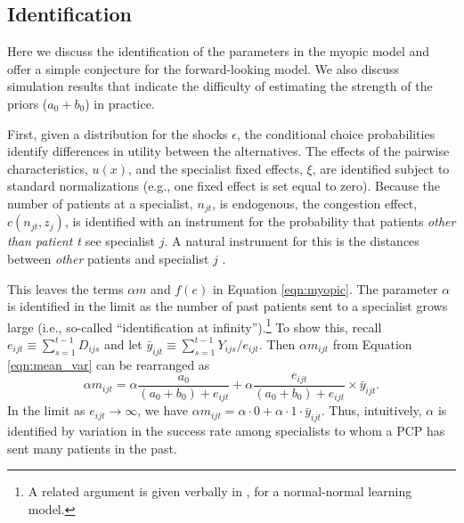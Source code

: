 \documentclass[12pt]{article}
\begin{document}

\subsection{Identification} 
\label{sec:identification}

Here we discuss the identification of the parameters in the myopic model and offer a simple conjecture for the forward-looking model. We also discuss simulation results that indicate the difficulty of estimating the strength of the priors ($a_0 + b_0$) in practice.

First, given a distribution for the shocks $\epsilon$, the conditional choice probabilities identify differences in utility between the alternatives. The effects of the pairwise characteristics, $u(x)$, and the specialist fixed effects, $\xi$, are identified subject to standard normalizations (e.g., one fixed effect is set equal to zero). Because the number of patients at a specialist, $n_{jt}$, is endogenous, the congestion effect, $c(n_{jt}, z_j)$, is identified with an instrument for the probability that patients \emph{other than patient t} see specialist $j$. A natural instrument for this is the distances between \emph{other} patients and specialist $j$ \citep[see the description of the estimation procedure in Section \ref{sec:estimation}, and][for further details]{richards-shubik2021}.

This leaves the terms $\alpha m$ and $f(e)$ in Equation \eqref{eqn:myopic}. The parameter $\alpha$ is identified in the limit as the number of past patients sent to a specialist grows large (i.e., so-called ``identification at infinity'').\footnote{A related argument is given verbally in \cite{ching2013}, for a normal-normal learning model.} To show this, recall $e_{ijt} \equiv \sum_{s=1}^{t-1} D_{ijs}$ and let $\bar y_{ijt} \equiv \sum_{s=1}^{t-1} Y_{ijs} / e_{ijt}$. Then $\alpha m_{ijt}$ from Equation \eqref{eqn:mean_var} can be rearranged as
\begin{equation}
\alpha m_{ijt} = \alpha \frac{ a_0 }{ (a_0 + b_0) + e_{ijt} }
+ \alpha \frac{ e_{ijt} }{ (a_0 + b_0) + e_{ijt} } \times \bar y_{ijt}.
\label{eqn:ID_eta}
\end{equation}
In the limit as $e_{ijt} \rightarrow \infty$, we have $\alpha m_{ijt} = \alpha \cdot 0 + \alpha \cdot 1 \cdot \bar y_{ijt}$.
Thus, intuitively, $\alpha$ is identified by variation in the success rate among specialists to whom a PCP has sent many patients in the past.
\end{document}
